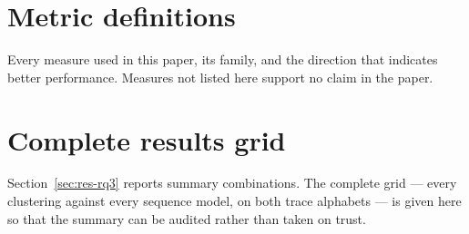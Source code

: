 \section{Metric definitions}\label{app:glossary}

Every measure used in this paper, its family, and the direction that indicates better
performance. Measures not listed here support no claim in the paper.



\clearpage
\section{Complete results grid}\label{app:full}

Section~\ref{sec:res-rq3} reports summary combinations. The complete grid --- every clustering
against every sequence model, on both trace alphabets --- is given here so that the summary can
be audited rather than taken on trust.


